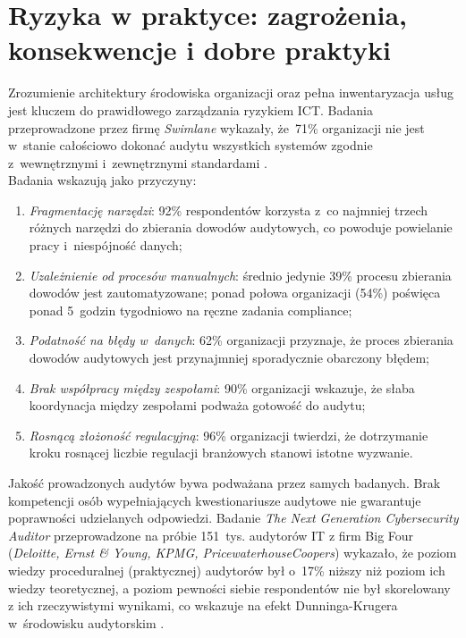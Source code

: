 \chapter{Ryzyka w praktyce: zagrożenia, konsekwencje i dobre praktyki}

Zrozumienie architektury środowiska organizacji oraz pełna inwentaryzacja usług jest kluczem do prawidłowego zarządzania ryzykiem ICT. Badania przeprowadzone przez firmę \textit{Swimlane} wykazały, że~71\% organizacji nie jest w~stanie całościowo dokonać audytu wszystkich systemów zgodnie z~wewnętrznymi i~zewnętrznymi standardami \autocite{swimlane2025grc}.\\
Badania wskazują jako przyczyny:

\begin{enumerate}[label=(\roman*)]
    \item \textit{Fragmentację narzędzi}: 92\% respondentów korzysta
          z~co najmniej trzech różnych narzędzi do zbierania dowodów
          audytowych, co powoduje powielanie pracy i~niespójność danych;
    \item \textit{Uzależnienie od procesów manualnych}: średnio jedynie
          39\% procesu zbierania dowodów jest zautomatyzowane; ponad
          połowa organizacji (54\%) poświęca ponad 5~godzin tygodniowo
          na ręczne zadania compliance;
    \item \textit{Podatność na błędy w~danych}: 62\% organizacji
          przyznaje, że proces zbierania dowodów audytowych jest
          przynajmniej sporadycznie obarczony błędem;
    \item \textit{Brak współpracy między zespołami}:
          90\% organizacji wskazuje, że słaba koordynacja między 
          zespołami  podważa gotowość do audytu;
    \item \textit{Rosnącą złożoność regulacyjną}: 96\% organizacji
          twierdzi, że dotrzymanie kroku rosnącej liczbie regulacji
          branżowych stanowi istotne wyzwanie.
\end{enumerate}


Jakość prowadzonych audytów bywa podważana przez samych badanych. Brak kompetencji osób wypełniających kwestionariusze audytowe nie gwarantuje poprawności udzielanych odpowiedzi.
Badanie \textit{The Next Generation Cybersecurity Auditor}
przeprowadzone na próbie 151~tys. audytorów IT z firm Big Four (\textit{Deloitte, Ernst \& Young, KPMG, PricewaterhouseCoopers}) wykazało, że poziom wiedzy proceduralnej (praktycznej) audytorów był o~17\% niższy niż poziom ich wiedzy teoretycznej, a poziom pewności siebie respondentów nie był skorelowany z ich rzeczywistymi
wynikami, co wskazuje na efekt Dunninga-Krugera w~środowisku audytorskim \autocite{nextgen2022auditor}.


